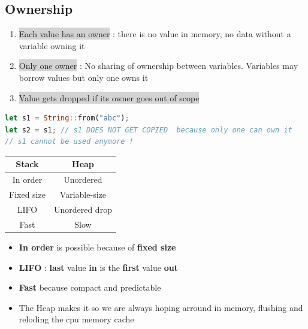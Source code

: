 \documentclass{report}
\begin{document}
\begin{multicols*}{2}

\section{Ownership}

\begin{enumerate}
  \item \colorbox{lightgray}{Each value has an owner} : there is no
        value in memory, no data without a variable owning it 
  \item \colorbox{lightgray}{Only one owner} : No sharing of ownership
        between variables. Variables may borrow values but only one owns it
  \item \colorbox{lightgray}{Value gets dropped if its owner goes out of scope} 
\end{enumerate}

\begin{tcolorbox}[title=Ownership is action,colback=backcolour,size=small,left=4mm]
\begin{lstlisting}[language=rust]
let s1 = String::from("abc");
let s2 = s1; // s1 DOES NOT GET COPIED  because only one can own it
// s1 cannot be used anymore !
\end{lstlisting}
\end{tcolorbox}

\begin{center}
  
  \begin{tabular}{c|c}
    \textbf{Stack} & \textbf{Heap} \\
    \hline
    In order & Unordered\\
    Fixed size & Variable-size\\
    LIFO & Unordered drop\\
    Fast & Slow\\
  \end{tabular}
\end{center}

\begin{itemize}
  \item \textbf{In order} is possible because of \textbf{fixed size} 
  \item \textbf{LIFO} : \textbf{last} value \textbf{in} is the \textbf{first} value \textbf{out} 
  \item \textbf{Fast} because compact and predictable 
  \item The Heap makes it so we are always hoping arround in memory, flushing
    and reloding the cpu memory cache
\end{itemize}


\end{multicols*}
\end{document}
